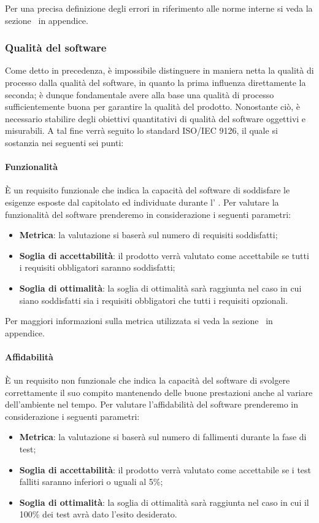 Per una precisa definizione degli errori in riferimento alle norme interne si veda la sezione~ in appendice.

\subsubsection{Qualità del software}
Come detto in precedenza, è impossibile distinguere in maniera netta la qualità di processo dalla qualità del software, in quanto la prima influenza direttamente la seconda; è dunque fondamentale avere alla base una qualità di processo sufficientemente buona per garantire la qualità del prodotto. Nonostante ciò, è necessario stabilire degli obiettivi quantitativi di qualità del software oggettivi e misurabili. A tal fine verrà seguito lo standard ISO/IEC 9126, il quale si sostanzia nei seguenti sei punti:

\paragraph{Funzionalità}
È un requisito funzionale che indica la capacità del software di soddisfare le esigenze esposte dal capitolato ed individuate durante l’ \AdR .
Per valutare la funzionalità del software prenderemo in considerazione i seguenti parametri:
\begin{itemize}
	\item \textbf{Metrica}: la valutazione si baserà sul numero di requisiti soddisfatti;
	\item \textbf{Soglia di accettabilità}: il prodotto verrà valutato come accettabile se tutti i requisiti obbligatori saranno soddisfatti;
	\item \textbf{Soglia di ottimalità}: la soglia di ottimalità sarà raggiunta nel caso in cui siano soddisfatti sia i requisiti obbligatori che tutti i requisiti opzionali.
\end{itemize}

Per maggiori informazioni sulla metrica utilizzata si veda la sezione~ in appendice.


\paragraph{Affidabilità}
È un requisito non funzionale che indica la capacità del software di svolgere correttamente il suo compito mantenendo delle buone prestazioni anche al variare dell’ambiente nel tempo.
Per valutare l'affidabilità del software prenderemo in considerazione i seguenti parametri:
\begin{itemize}
	\item \textbf{Metrica}: la valutazione si baserà sul numero di fallimenti durante la fase di test;
	\item \textbf{Soglia di accettabilità}: il prodotto verrà valutato come accettabile se i test falliti saranno inferiori o uguali al 5\%;
	\item \textbf{Soglia di ottimalità}: la soglia di ottimalità sarà raggiunta nel caso in cui il 100\% dei test avrà dato l'esito desiderato.
\end{itemize}

